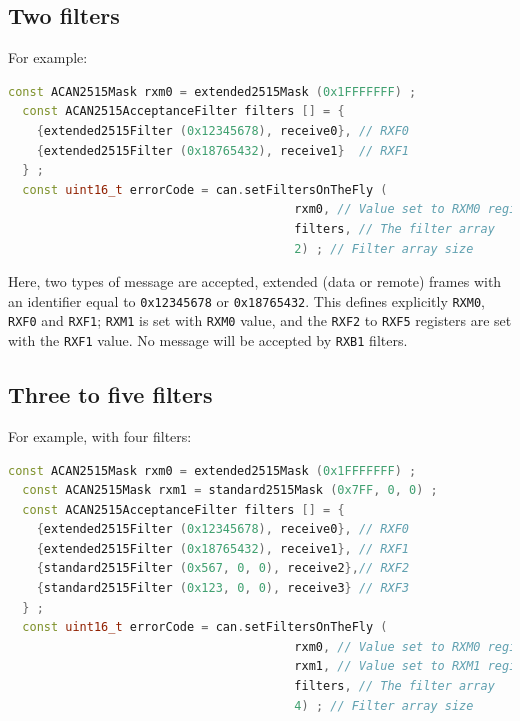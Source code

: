 \documentclass[9pt, a4paper, obeyspaces]{extarticle}
\begin{document}
\subsection{Two filters}

For example:
{ \small\begin{lstlisting}[language=c++]
  const ACAN2515Mask rxm0 = extended2515Mask (0x1FFFFFFF) ;
  const ACAN2515AcceptanceFilter filters [] = {
    {extended2515Filter (0x12345678), receive0}, // RXF0
    {extended2515Filter (0x18765432), receive1}  // RXF1
  } ;
  const uint16_t errorCode = can.setFiltersOnTheFly (
                                        rxm0, // Value set to RXM0 register
                                        filters, // The filter array
                                        2) ; // Filter array size
\end{lstlisting}}

Here, two types of message are accepted, extended (data or remote) frames with an identifier equal to \texttt{0x12345678} or \texttt{0x18765432}. This defines explicitly \texttt{RXM0}, \texttt{RXF0} and \texttt{RXF1}; \texttt{RXM1} is set with \texttt{RXM0} value, and the \texttt{RXF2} to \texttt{RXF5} registers are set with the \texttt{RXF1} value. No message will be accepted by \texttt{RXB1} filters.










\subsection{Three to five filters}

For example, with four filters:
{ \small\begin{lstlisting}[language=c++]
  const ACAN2515Mask rxm0 = extended2515Mask (0x1FFFFFFF) ;
  const ACAN2515Mask rxm1 = standard2515Mask (0x7FF, 0, 0) ;
  const ACAN2515AcceptanceFilter filters [] = {
    {extended2515Filter (0x12345678), receive0}, // RXF0
    {extended2515Filter (0x18765432), receive1}, // RXF1
    {standard2515Filter (0x567, 0, 0), receive2},// RXF2
    {standard2515Filter (0x123, 0, 0), receive3} // RXF3
  } ;
  const uint16_t errorCode = can.setFiltersOnTheFly (
                                        rxm0, // Value set to RXM0 register
                                        rxm1, // Value set to RXM1 register
                                        filters, // The filter array
                                        4) ; // Filter array size
\end{lstlisting}}
\end{document}
